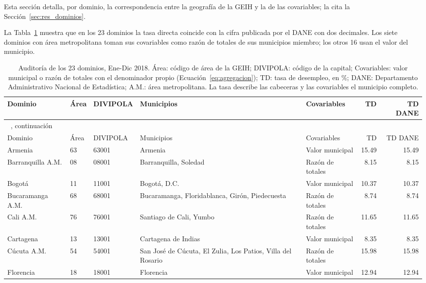 Esta sección detalla, por dominio, la correspondencia entre la geografía de la GEIH y la de las covariables; la cita la Sección~\ref{sec:res_dominios}.

La Tabla~\ref{tab:app_auditoria} muestra que en los 23 dominios la tasa directa coincide con la cifra publicada por el DANE con dos decimales. Los siete dominios con área metropolitana toman sus covariables como razón de totales de sus municipios miembro; los otros 16 usan el valor del municipio.

{\footnotesize\setlength{\tabcolsep}{3pt}
\begin{longtable}{p{2.0cm} p{1.0cm} p{1.7cm} p{2.3cm} p{1.9cm} r r}
\caption[Auditoría de los dominios de estimación]{Auditoría de los 23 dominios, Ene-Dic 2018. Área: código de área de la GEIH; DIVIPOLA: código de la capital; Covariables: valor municipal o razón de totales con el denominador propio (Ecuación~\ref{eq:agregacion}); TD: tasa de desempleo, en \%; DANE: Departamento Administrativo Nacional de Estadística; A.M.: área metropolitana. La tasa describe las cabeceras y las covariables el municipio completo.}
\label{tab:app_auditoria} \\
\toprule
Dominio & Área & DIVIPOLA & Municipios & Covariables & TD & TD DANE \\
\midrule
\endfirsthead
\multicolumn{7}{l}{\tablename~\thetable{}, continuación} \\
\toprule
Dominio & Área & DIVIPOLA & Municipios & Covariables & TD & TD DANE \\
\midrule
\endhead
\bottomrule
\endlastfoot
Armenia & 63 & 63001 & Armenia & Valor municipal & 15.49 & 15.49 \\
Barranquilla A.M. & 08 & 08001 & Barranquilla, Soledad & Razón de totales & 8.15 & 8.15 \\
Bogotá & 11 & 11001 & Bogotá, D.C. & Valor municipal & 10.37 & 10.37 \\
Bucaramanga A.M. & 68 & 68001 & Bucaramanga, Floridablanca, Girón, Piedecuesta & Razón de totales & 8.74 & 8.74 \\
Cali A.M. & 76 & 76001 & Santiago de Cali, Yumbo & Razón de totales & 11.65 & 11.65 \\
Cartagena & 13 & 13001 & Cartagena de Indias & Valor municipal & 8.35 & 8.35 \\
Cúcuta A.M. & 54 & 54001 & San José de Cúcuta, El Zulia, Los Patios, Villa del Rosario & Razón de totales & 15.98 & 15.98 \\
Florencia & 18 & 18001 & Florencia & Valor municipal & 12.94 & 12.94 \\

\end{longtable}}
